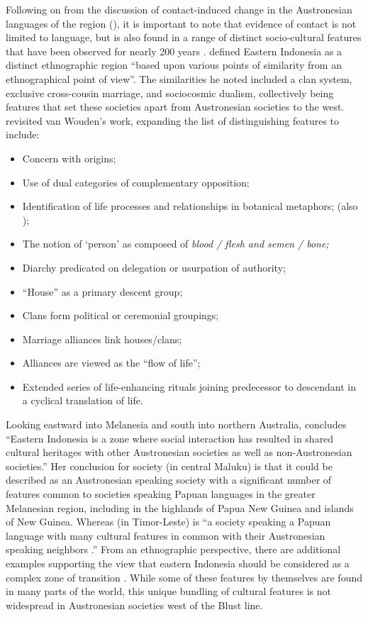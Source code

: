 \largerpage
{}
Following on from the discussion of contact-induced change in
the Austronesian languages of the region (),
it is important to note that evidence of contact is not limited
to language, but is also found in a range of distinct socio-cultural features
that have been observed for nearly 200 years \citep{Fox2015}.
\citet[1]{vanWouden1935} defined Eastern Indonesia as a distinct
ethnographic region “based upon various points of similarity
from an ethnographical point of view”.
The similarities he noted included a clan system,
exclusive cross-cousin marriage, and sociocosmic dualism,
collectively being features that set these societies apart from
Austronesian societies to the west.
\citet{Fox1980,Fox1989,Fox2015} revisited van Wouden’s work,
expanding the list of distinguishing features to include:

\begin{itemize}
	\item Concern with origins;
	\item Use of dual categories of complementary opposition;
	\item Identification of life processes and relationships in botanical metaphors; (also \citealp{Fox1971});
	\item The notion of ‘person’ as composed of \it{blood / flesh} and \it{semen / bone};
	\item Diarchy predicated on delegation or usurpation of authority;
	\item “House” as a primary descent group;
	\item Clans form political or ceremonial groupings;
	\item Marriage alliances link houses/clans;
	\item Alliances are viewed as the “flow of life”;
	\item Extended series of life-enhancing rituals joining predecessor to descendant in a cyclical translation of life.
\end{itemize}

Looking eastward into Melanesia
and south into northern Australia,
\citet[18]{Grimes2010} concludes “Eastern Indonesia is a zone where
social interaction has resulted in shared cultural heritages
with other Austronesian societies as well as non-Austronesian
societies.” Her conclusion for  society (in central Maluku)
is that it could be described as an Austronesian speaking society
with a significant number of features common to societies speaking
Papuan languages in the greater Melanesian region,
including in the highlands of Papua New Guinea
and islands  of New Guinea.
Whereas  (in Timor-Leste) is “a society speaking a Papuan
language with many cultural features in common with their Austronesian
speaking neighbors \citep{McWilliam2007}.” From an ethnographic perspective,
there are additional examples supporting the view that eastern
Indonesia should be considered as a complex zone of transition \citep[191]{Fox2015}.
While some of these features by themselves are found in many
parts of the world,
this unique bundling of cultural features is not widespread in
Austronesian societies west of the Blust line.

